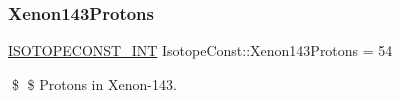 \subsubsection{\texorpdfstring{Xenon143\+Protons}{Xenon143Protons}}
{\footnotesize\ttfamily \mbox{\hyperlink{group___isotope_const-_macros_ga5f18360b3e99483a35c32d789e62621c}{I\+S\+O\+T\+O\+P\+E\+C\+O\+N\+S\+T\+\_\+\+I\+NT}} Isotope\+Const\+::\+Xenon143\+Protons = 54}

\$ \$ Protons in Xenon-\/143. 